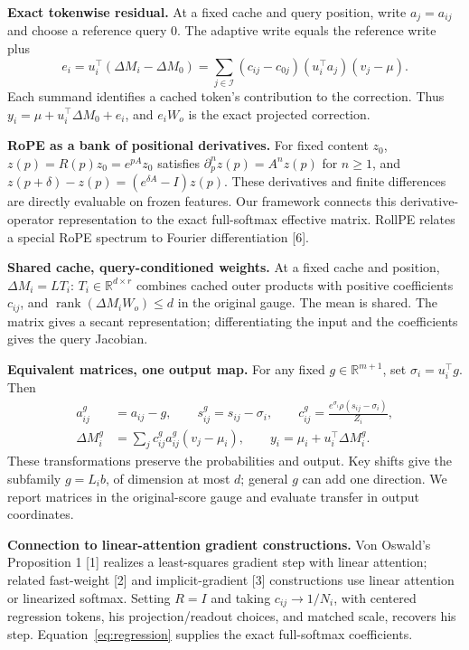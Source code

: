 \documentclass[10pt,a4paper]{article}
\newcommand{\R}{\mathbb R}
\newcommand{\T}{^{\!\top}}
\newcommand{\calI}{\mathcal I}
\newcommand{\ddM}{\Delta M}
\begin{document}
\textbf{Exact tokenwise residual.}
At a fixed cache and query position, write $a_j=a_{ij}$ and choose a reference
query $0$. The adaptive write equals the reference write plus
\begin{equation}
\boxed{\displaystyle
e_i=u_i\T(\ddM_i-\ddM_0)
=\sum_{j\in\calI}(c_{ij}-c_{0j})(u_i\T a_j)(v_j-\mu).}
\label{eq:tokenerror}
\end{equation}
Each summand identifies a cached token's contribution to the correction.
Thus $y_i=\mu+u_i\T\ddM_0+e_i$, and $e_iW_o$ is the exact projected correction.

\textbf{RoPE as a bank of positional derivatives.}
For fixed content $z_0$, $z(p)=R(p)z_0=e^{pA}z_0$ satisfies
$\partial_p^n z(p)=A^nz(p)$ for $n\geq1$, and
$z(p+\delta)-z(p)=(e^{\delta A}-I)z(p)$.
These derivatives and finite differences are directly evaluable on frozen features.
Our framework connects this derivative-operator representation to the exact
full-softmax effective matrix. RollPE relates a special RoPE spectrum to Fourier
differentiation [6].

\textbf{Shared cache, query-conditioned weights.}
At a fixed cache and position, $\ddM_i=LT_i$: $T_i\in\R^{d\times r}$ combines
cached outer products with positive coefficients $c_{ij}$, and
$\operatorname{rank}(\ddM_iW_o)\leq d$ in the original gauge. The mean is shared.
The matrix gives a secant representation; differentiating the input and the
coefficients gives the query Jacobian.

\textbf{Equivalent matrices, one output map.}
For any fixed $g\in\R^{m+1}$, set $\sigma_i=u_i\T g$. Then
\begin{equation}
\begin{aligned}
a_{ij}^{g}&=a_{ij}-g,\qquad s_{ij}^{g}=s_{ij}-\sigma_i,
\qquad c_{ij}^{g}=\frac{e^{\sigma_i}\rho(s_{ij}-\sigma_i)}{Z_i},\\
\ddM_i^{g}&=\sum_j c_{ij}^{g}a_{ij}^{g}(v_j-\mu_i),
\qquad y_i=\mu_i+u_i\T\ddM_i^{g}.
\end{aligned}
\label{eq:gauge}
\end{equation}
These transformations preserve the probabilities and output. Key shifts give the
subfamily $g=L_i b$, of dimension at most $d$; general $g$ can add one direction.
We report matrices in the original-score gauge and evaluate transfer in output coordinates.

\textbf{Connection to linear-attention gradient constructions.}
Von Oswald's Proposition 1 [1] realizes a least-squares gradient step with linear
attention; related fast-weight [2] and implicit-gradient [3] constructions use
linear attention or linearized softmax. Setting $R=I$ and taking $c_{ij}\to1/N_i$,
with centered regression tokens, his projection/readout choices, and matched scale,
recovers his step. Equation~\eqref{eq:regression} supplies the exact full-softmax coefficients.
\end{document}
